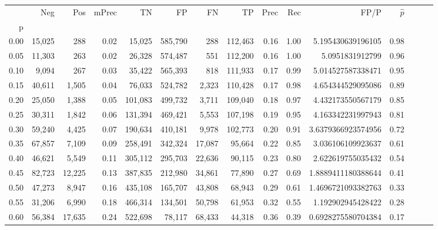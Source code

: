\begin{tabular}{rrrrrrrrrrrrrrr}
\toprule
{} &     Neg &     Pos & mPrec &       TN &       FP &       FN &       TP &  Prec &   Rec &                  FP/P & $\hat{p}$ \\
p    &         &         &       &          &          &          &          &       &       &                       &           \\
\midrule
0.00 &  15,025 &     288 &  0.02 &   15,025 &  585,790 &      288 &  112,463 &  0.16 &  1.00 &     5.195430639196105 &      0.98 \\
0.05 &  11,303 &     263 &  0.02 &   26,328 &  574,487 &      551 &  112,200 &  0.16 &  1.00 &       5.0951831912799 &      0.96 \\
0.10 &   9,094 &     267 &  0.03 &   35,422 &  565,393 &      818 &  111,933 &  0.17 &  0.99 &     5.014527587338471 &      0.95 \\
0.15 &  40,611 &   1,505 &  0.04 &   76,033 &  524,782 &    2,323 &  110,428 &  0.17 &  0.98 &     4.654344529095086 &      0.89 \\
0.20 &  25,050 &   1,388 &  0.05 &  101,083 &  499,732 &    3,711 &  109,040 &  0.18 &  0.97 &     4.432173550567179 &      0.85 \\
0.25 &  30,311 &   1,842 &  0.06 &  131,394 &  469,421 &    5,553 &  107,198 &  0.19 &  0.95 &     4.163342231997943 &      0.81 \\
0.30 &  59,240 &   4,425 &  0.07 &  190,634 &  410,181 &    9,978 &  102,773 &  0.20 &  0.91 &    3.6379366923574956 &      0.72 \\
0.35 &  67,857 &   7,109 &  0.09 &  258,491 &  342,324 &   17,087 &   95,664 &  0.22 &  0.85 &     3.036106109923637 &      0.61 \\
0.40 &  46,621 &   5,549 &  0.11 &  305,112 &  295,703 &   22,636 &   90,115 &  0.23 &  0.80 &     2.622619755035432 &      0.54 \\
0.45 &  82,723 &  12,225 &  0.13 &  387,835 &  212,980 &   34,861 &   77,890 &  0.27 &  0.69 &    1.8889411180388644 &      0.41 \\
0.50 &  47,273 &   8,947 &  0.16 &  435,108 &  165,707 &   43,808 &   68,943 &  0.29 &  0.61 &    1.4696721093382763 &      0.33 \\
0.55 &  31,206 &   6,990 &  0.18 &  466,314 &  134,501 &   50,798 &   61,953 &  0.32 &  0.55 &     1.192902945428422 &      0.28 \\
0.60 &  56,384 &  17,635 &  0.24 &  522,698 &   78,117 &   68,433 &   44,318 &  0.36 &  0.39 &    0.6928275580704384 &      0.17 \\

\end{tabular}
